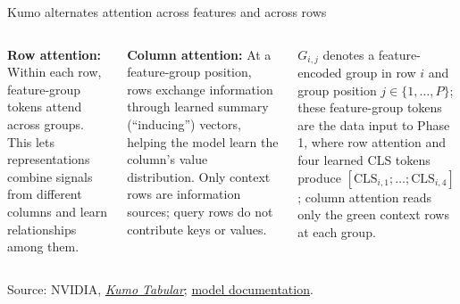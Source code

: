 \documentclass[11pt,aspectratio=169,hyperref={colorlinks}]{beamer}
\newcommand{\slidesource}[1]{\par\vfill\noindent\parbox{\linewidth}{\tiny\color{sourcegray}\raggedright\sloppy Source: #1.}}
\newcommand{\visualdescription}[1]{\par\vspace{.2em}\noindent\parbox{\linewidth}{\centering\tiny\color{sourcegray}#1}}
\begin{document}
\begin{frame}{Kumo alternates attention across features and across rows}
\small
\begin{columns}[c]
\begin{block}{\textbf{Row attention:}}
Within each row, feature-group tokens attend across groups. This lets representations combine signals from different columns and learn relationships among them.
\end{block}
\begin{block}{\textbf{Column attention:}}
At a feature-group position, rows exchange information through learned summary (``inducing'') vectors, helping the model learn the column's value distribution. Only context rows are information sources; query rows do not contribute keys or values.
\end{block}
\centering
{}
\visualdescription{$G_{i,j}$ denotes a feature-encoded group in row $i$ and group position $j\in\{1,\ldots,P\}$; these feature-group tokens are the data input to Phase 1, where \textcolor{rowpurple}{row attention} and four learned CLS tokens produce $[\mathrm{CLS}_{i,1};\ldots;\mathrm{CLS}_{i,4}]$; \textcolor{orange!80!black}{column attention} reads only the green context rows at each group.}
\end{columns}
\slidesource{NVIDIA, \href{https://huggingface.co/blog/nvidia/kumo-tabular}{\emph{Kumo Tabular}}; \href{https://docs.nvidia.com/sdgm/structured-data-models/models/kumo-tabular}{model documentation}}
\end{frame}
\end{document}
